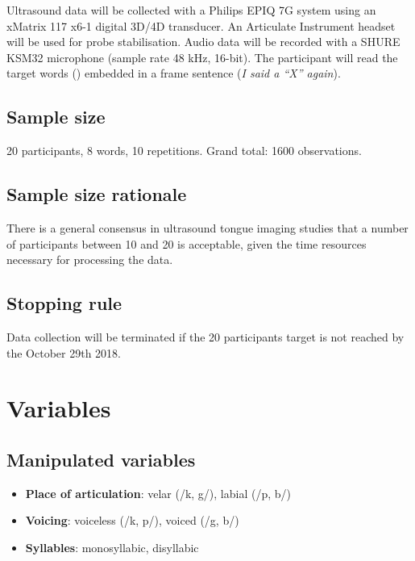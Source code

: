 \documentclass[11pt,]{article}
\providecommand{\tightlist}{%
  \setlength{\itemsep}{0pt}\setlength{\parskip}{0pt}}
\begin{document}
Ultrasound data will be collected with a Philips EPIQ 7G system using an
xMatrix 117 x6-1 digital 3D/4D transducer. An Articulate Instrument
headset will be used for probe stabilisation. Audio data will be
recorded with a SHURE KSM32 microphone (sample rate 48 kHz, 16-bit). The
participant will read the target words () embedded
in a frame sentence (\emph{I said a ``X'' again}).

\subsection{Sample size}\label{sample-size}

20 participants, 8 words, 10 repetitions. Grand total: 1600
observations.

\subsection{Sample size rationale}\label{sample-size-rationale}

There is a general consensus in ultrasound tongue imaging studies that a
number of participants between 10 and 20 is acceptable, given the time
resources necessary for processing the data.

\subsection{Stopping rule}\label{stopping-rule}

Data collection will be terminated if the 20 participants target is not
reached by the October 29th 2018.

\section{Variables}\label{variables}

\subsection{Manipulated variables}\label{manipulated-variables}

\label{s:manipulated}

\begin{itemize}
\tightlist
\item
  \textbf{Place of articulation}: velar (/k, g/), labial (/p, b/)
\item
  \textbf{Voicing}: voiceless (/k, p/), voiced (/g, b/)
\item
  \textbf{Syllables}: monosyllabic, disyllabic
\end{itemize}
\end{document}
